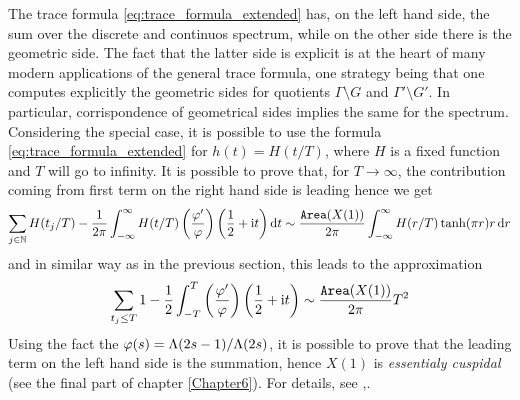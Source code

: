 The trace formula \eqref{eq:trace_formula_extended} has, on the left hand side, the sum over the discrete and continuos spectrum, while on the other side there is the geometric side. The fact that the latter side is explicit is at the heart of many modern applications of the general trace formula, one strategy being that one computes explicitly the geometric
sides for quotients $\Gamma\setminus G$ and $\Gamma'\setminus G'$. In particular, corrispondence of geometrical sides implies the same for the spectrum.\\
Considering the special case, it is possible to use the formula \eqref{eq:trace_formula_extended} for $h(t)=H(t/T)$, where $H$ is a fixed function and $T$ will go to infinity. It is possible to prove that, for $T\to\infty$, the contribution coming from first term on the right hand side is leading hence we get
\[
\sum_{j\in\mathbb{N}}H(t_{j}/T)-\frac{1}{2\pi}\int_{-\infty}^{\infty}H(t/T)\left(\frac{\varphi'}{\varphi}\right)\left(\frac{1}{2}+\mathrm{i} t\right)\mathop{}\!\mathrm{d} t\sim \frac{\operatorname{\mathtt{Area}}(X(1))}{2\pi}\int_{-\infty}^{\infty}H(r/T)\tanh(\pi r)r\mathop{}\!\mathrm{d} r
\]
and in similar way as in the previous section, this leads to the approximation
\[
\sum_{t_{j}\leq T}1-\frac{1}{2}\int_{-T}^{T}\left(\frac{\varphi'}{\varphi}\right)\left(\frac{1}{2}+\mathrm{i} t\right)\sim\frac{\operatorname{\mathtt{Area}}(X(1))}{2\pi}T^{2}
\]
Using the fact the $\varphi(s)=\Lambda(2s-1)/\Lambda(2s)$, it is possible to prove that the leading term on the left hand side is the summation, hence $X(1)$ is \emph{essentialy cuspidal} (see the final part of chapter \ref{Chapter6}). For details, see \cite{Sarnak:review},\cite{Shimura:book}.




